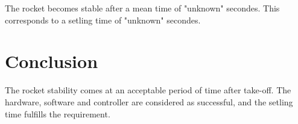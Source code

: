 	
The rocket becomes stable after a mean time of "unknown" secondes. This corresponds to a setling time of "unknown" secondes.
 
 
 

	\section*{Conclusion}

The rocket stability comes at an acceptable period of time after take-off. The hardware, software and controller are considered as successful, and the setling time fulfills the requirement.


